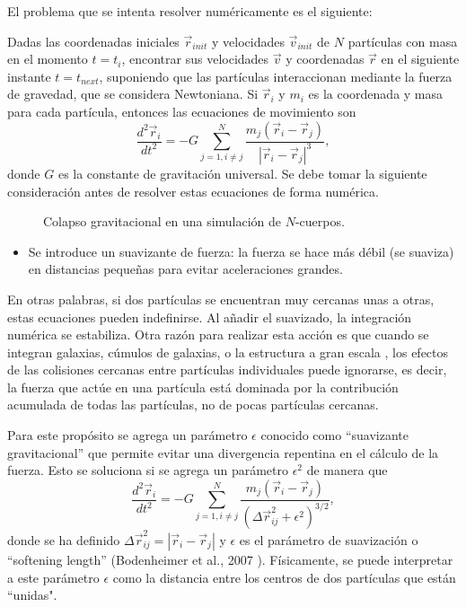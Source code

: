\documentclass[a4paper,openright,12pt]{book}
\begin{document}
El problema que se intenta resolver numéricamente es el siguiente:

Dadas las coordenadas iniciales $\vec{r}_{init}$ y velocidades $\vec{v}_{init}$ de $N$ partículas con masa en el momento $t = t_{i}$, encontrar sus velocidades $\vec{v}$ y coordenadas $\vec{r}$ en el siguiente instante $t = t_{next}$, suponiendo que las partículas interaccionan mediante la fuerza de gravedad, que se considera Newtoniana. Si $\vec{r}_{i}$ y $m_{i}$ es la coordenada y masa para cada partícula, entonces las ecuaciones de movimiento son
\begin{equation}
\frac{d^{2}\vec{r}_{i}}{d t^{2}}=
-G \sum_{j=1, i \not= j}^{N} \frac{m_{j}(\vec{r}_{i}-\vec{r}_{j})}{|\vec{r}_{i}-\vec{r}_{j}|^{3}}, \label{eqn 2.8}
\end{equation}
donde $G$ es la constante de gravitación universal. Se debe tomar la siguiente consideración antes de resolver estas ecuaciones de forma numérica.

\begin{figure}
\centering
{}
\caption{\footnotesize{Colapso gravitacional en una simulación de $N$-cuerpos.}}
\end{figure}

\begin{itemize}
\item Se introduce un suavizante de fuerza: la fuerza se hace más débil (se suaviza) en distancias pequeñas para evitar aceleraciones grandes.
\end{itemize} 
En otras palabras, si dos partículas se encuentran muy cercanas unas a otras, estas ecuaciones pueden indefinirse. Al añadir el suavizado, la integración numérica se estabiliza. Otra razón para realizar esta acción es que cuando se integran galaxias, cúmulos de galaxias, o la estructura a gran escala , los efectos de las colisiones cercanas entre partículas individuales puede ignorarse, es decir, la fuerza que actúe en una partícula está dominada por la contribución acumulada de todas las partículas, no de pocas partículas cercanas.

Para este propósito se agrega un parámetro $\epsilon$ conocido como “suavizante gravitacional” que permite evitar una divergencia repentina en el cálculo de la fuerza. Esto se soluciona si se agrega un parámetro $\epsilon^{2}$ de manera que 
\begin{equation}
\frac{d^{2}\vec{r}_{i}}{d t^{2}}=
-G \sum_{j=1, i \not= j}^{N} \frac{m_{j}(\vec{r}_{i}-\vec{r}_{j})}{(\Delta\vec{r}_{ij}^{2} + \epsilon^{2})^{3/2}},\label{eqn2.7}
\end{equation} 
donde se ha definido $\Delta\vec{r}_{ij}^{2} = |\vec{r}_{i} - \vec{r}_{j}|$ y $\epsilon$ es el parámetro de suavización o “softening length” (Bodenheimer et al., 2007 \cite{b5}). Físicamente, se puede interpretar a este parámetro $\epsilon$ como la distancia entre los centros de dos partículas que están “unidas".
\end{document}
